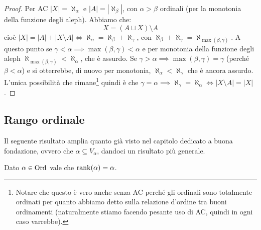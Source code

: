 \begin{proof}
	Per AC $|X| = \aleph_\alpha$ e $|A| = |\aleph_\beta|$, con $\alpha > \beta$ ordinali (per la monotonia della funzione degli aleph). Abbiamo che:
	\[ X = (A \sqcup X)\setminus A
		\]
	cio\`e $|X| = |A| + |X \setminus A| \iff \aleph_\alpha = \aleph_\beta + \aleph_\gamma$, con $\aleph_\beta + \aleph_\gamma = \aleph_{\max(\beta,\gamma)}$.
	A questo punto se $\gamma < \alpha \implies \max(\beta,\gamma) < \alpha$ e per monotonia della funzione degli aleph $\aleph_{\max(\beta,\gamma)} < \aleph_\alpha$, che \`e assurdo.
	Se $\gamma > \alpha \implies \max(\beta,\gamma) = \gamma$ (perch\'e $\beta < \alpha$) e si otterrebbe, di nuovo per monotonia, $\aleph_\alpha < \aleph_\gamma$ che \`e ancora assurdo.
	L'unica possibilit\`a che rimane\footnote{Notare che questo \`e vero anche senza AC perch\'e gli ordinali sono totalmente ordinati per quanto abbiamo detto sulla relazione d'ordine tra buoni ordinamenti (naturalmente stiamo facendo pesante uso di AC, quindi in ogni caso varrebbe).}
	quindi \`e che $\gamma = \alpha \implies \aleph_\gamma = \aleph_\alpha \iff |X \setminus A| = |X|$.
\end{proof}

\pagebreak
\subsection{Rango ordinale}
Il seguente risultato amplia quanto gi\`a visto nel capitolo dedicato a buona fondazione, ovvero che $\alpha \subseteq V_\alpha$, dandoci un risultato pi\`u generale. 
\begin{proposition}
	Dato $\alpha \in \operatorname{Ord}$ vale che $\operatorname{rank}(\alpha) = \alpha$.
\end{proposition}


